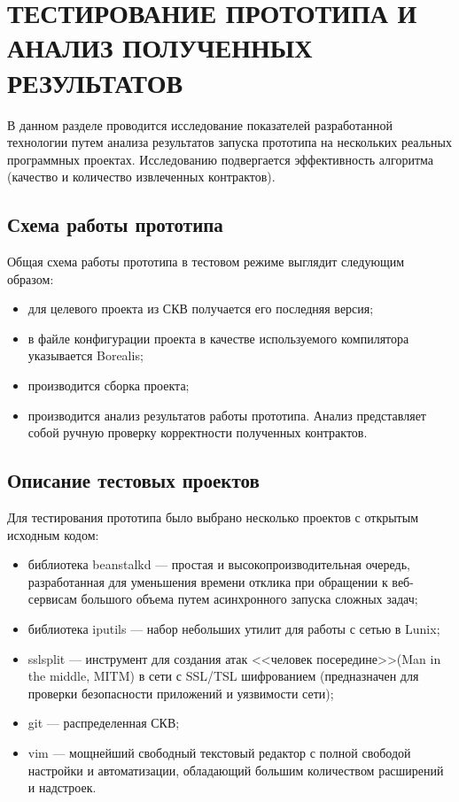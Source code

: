 \chapter{ТЕСТИРОВАНИЕ ПРОТОТИПА И АНАЛИЗ ПОЛУЧЕННЫХ РЕЗУЛЬТАТОВ}
\label{chapter:testing}
В данном разделе проводится исследование показателей разработанной технологии путем анализа результатов запуска прототипа на нескольких реальных программных проектах. Исследованию подвергается эффективность алгоритма (качество и количество извлеченных контрактов).

\section{Схема работы прототипа}
Общая схема работы прототипа в тестовом режиме выглядит следующим образом:
\begin{itemize}
\item для целевого проекта из СКВ получается его последняя версия;
\item в файле конфигурации проекта в качестве используемого компилятора указывается Borealis;
\item производится сборка проекта;
\item производится анализ результатов работы прототипа. Анализ представляет собой ручную проверку корректности полученных контрактов.
\end{itemize}

\section{Описание тестовых проектов}
Для тестирования прототипа было выбрано несколько проектов с открытым исходным кодом:
\begin{itemize}
\item библиотека beanstalkd --- простая и высокопроизводительная очередь, разработанная для уменьшения времени отклика при обращении к веб-сервисам большого объема путем асинхронного запуска сложных задач;
\item библиотека iputils --- набор небольших утилит для работы с сетью в Lunix;
\item sslsplit --- инструмент для создания атак <<человек посередине>>(Man in the middle, MITM) в сети с SSL/TSL шифрованием (предназначен для проверки безопасности приложений и уязвимости сети);
\item git --- распределенная СКВ;
\item vim ---  мощнейший свободный текстовый редактор с полной свободой настройки и автоматизации, обладающий большим количеством расширений и надстроек.
\end{itemize}

